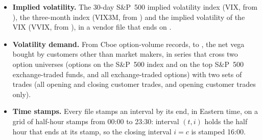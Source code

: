 \begin{itemize}
  posts tagged by their users: attention, the number of posts in the half hour; the sentiment score, $1$ when every
  tagged post is bullish and $-1$ when every tagged post is bearish; and the sentiment count, the number of posts
  tagged bullish or bearish.
\item \textbf{Implied volatility.} The 30-day S\&P~500 implied volatility index (VIX, from \rhlvVixFirst), the
  three-month index (VIX3M, from \rhlvVixThreeFirst) and the implied volatility of the VIX (VVIX, from
  \rhlvVvixFirst), in a vendor file that ends on \rhdsVixVendorLast.
\item \textbf{Volatility demand.} From Cboe option-volume records, \rhlvVdFirst{} to \rhdsVdLast, the net vega bought by
  customers other than market makers, in \bkSizeVd{} series that cross two option universes (options on the
  S\&P~500 index and on the top S\&P~500 exchange-traded funds, and all exchange-traded options) with two sets of
  trades (all opening and closing customer trades, and opening customer trades only).
\item \textbf{Time stamps.} Every file stamps an interval by its end, in Eastern time, on a grid of half-hour stamps
  from 00:00 to 23:30: interval $(t,i)$ holds the half hour that ends at its stamp, so the closing interval $i = c$ is
  stamped 16:00.

\end{itemize}
